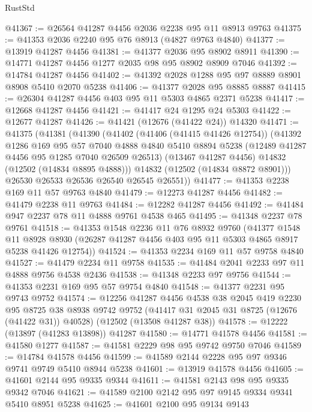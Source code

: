 \begin{lexlean}{RustStd}
\begin{coremodule}
@41367 := @26564 @41287 @4456 @2036 @2238 @95 @11 @8913 @9763
@41375 := @41353 @2036 @2240 @95 @76 @8913 (@4827 @9763 @4840)
@41377 := @13919 @41287 @4456
@41381 := @41377 @2036 @95 @8902 @8911
@41390 := @14771 @41287 @4456 @1277 @2035 @98 @95 @8902 @8909 @7046
@41392 := @14784 @41287 @4456
@41402 := @41392 @2028 @1288 @95 @97 @8889 @8901 @8908 @5410 @2070 @5238
@41406 := @41377 @2028 @95 @8885 @8887
@41415 := @26304 @41287 @4456 @403 @95 @11 @5303 @4865 @2371 @5238
@41417 := @12668 @41287 @4456
@41421 := @41417 @24 @1295 @24 @5303
@41422 := @12677 @41287
@41426 := @41421 (@12676 (@41422 @24)) @14320
@41471 := @41375
    (@41381
      (@41390
        (@41402
          (@41406 (@41415 @41426 @12754))
          (@41392
            @1286
            @169
            @95
            @57
            @7040
            @4888
            @4840
            @5410
            @8894
            @5238
            (@12489 @41287 @4456 @95 @1285 @7040 @26509 @26513)
            (@13467 @41287 @4456)
            @14832
            (@12502 (@14834 @8895 @4888)))
          @14832
          (@12502 (@14834 @8872 @8901)))
        @26530
        @26533
        @26536
        @26540
        @26545
        @26551))
@41477 := @41353 @2238 @169 @11 @57 @9763 @4840
@41479 := @12273 @41287 @4456
@41482 := @41479 @2238 @11 @9763
@41484 := @12282 @41287 @4456
@41492 := @41484 @947 @2237 @78 @11 @4888 @9761 @4538 @465
@41495 := @41348 @2237 @78 @9761
@41518 := @41353
    @1548
    @2236
    @11
    @76
    @8932
    @9760
    (@41377
      @1548
      @11
      @8928
      @8930
      (@26287 @41287 @4456 @403 @95 @11 @5303 @4865 @8917 @5238 @41426 @12754))
@41524 := @41353 @2234 @169 @11 @57 @9758 @4840
@41527 := @41479 @2234 @11 @9758
@41535 := @41484 @2041 @2233 @97 @11 @4888 @9756 @4538 @2436
@41538 := @41348 @2233 @97 @9756
@41544 := @41353 @2231 @169 @95 @57 @9754 @4840
@41548 := @41377 @2231 @95 @9743 @9752
@41574 := @12256
    @41287
    @4456
    @4538
    @38
    @2045
    @419
    @2230
    @95
    @8725
    @38
    @8938
    @9742
    @9752
    (@41417 @31 @2045 @31 @8725 (@12676 (@41422 @31)) @40528)
    (@12502 (@13508 @41287 @38))
@41578 := @12222 (@13897 (@41283 @13898)) @41287
@41580 := @14771 @41578 @4456
@41581 := @41580 @1277
@41587 := @41581 @2229 @98 @95 @9742 @9750 @7046
@41589 := @14784 @41578 @4456
@41599 := @41589 @2144 @2228 @95 @97 @9346 @9741 @9749 @5410 @8944 @5238
@41601 := @13919 @41578 @4456
@41605 := @41601 @2144 @95 @9335 @9344
@41611 := @41581 @2143 @98 @95 @9335 @9342 @7046
@41621 := @41589 @2100 @2142 @95 @97 @9145 @9334 @9341 @5410 @8951 @5238
@41625 := @41601 @2100 @95 @9134 @9143

\end{coremodule}
\end{lexlean}
